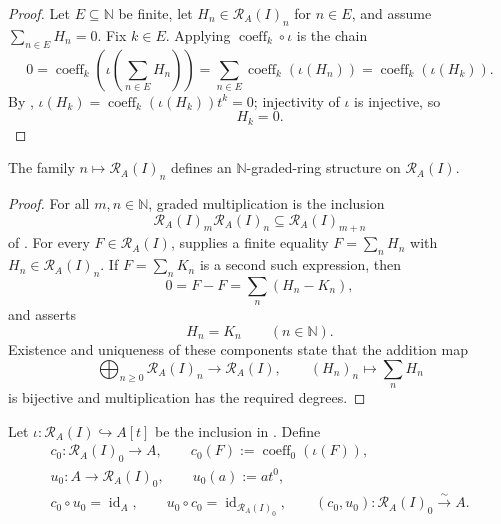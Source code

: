 \begin{proof}
  \leanok
  Let $E\subseteq\mathbb N$ be finite, let
  $H_n\in\mathcal R_A(I)_n$ for $n\in E$, and assume
  $\sum_{n\in E}H_n=0$.  Fix $k\in E$.  Applying
  $\operatorname{coeff}_k\circ\iota$ is the chain
  \[
    0
      =\operatorname{coeff}_k\!\left(\iota\!\left(
          \sum_{n\in E}H_n\right)\right)
      =\sum_{n\in E}\operatorname{coeff}_k(\iota(H_n))
      =\operatorname{coeff}_k(\iota(H_k)).
  \]
  By ,
  $\iota(H_k)=\operatorname{coeff}_k(\iota(H_k))t^k=0$; injectivity of
  $\iota$ is injective, so
  \[
    H_k=0.
  \]
\end{proof}

\begin{proposition}
  \label{prop:nagata-rees-graded}
  \leanok

  The family $n\mapsto\mathcal R_A(I)_n$ defines an
  $\mathbb N$-graded-ring structure on $\mathcal R_A(I)$.
\end{proposition}

\begin{proof}
  \leanok
  For all $m,n\in\mathbb N$, graded multiplication is the inclusion
  \[
    \mathcal R_A(I)_m\mathcal R_A(I)_n
      \subseteq\mathcal R_A(I)_{m+n}
  \]
  of .  For every
  $F\in\mathcal R_A(I)$,  supplies a
  finite equality $F=\sum_nH_n$ with
  $H_n\in\mathcal R_A(I)_n$.  If $F=\sum_nK_n$ is a second such expression,
  then
  \[
    0=F-F=\sum_n(H_n-K_n),
  \]
  and  asserts
  \[
    H_n=K_n\qquad(n\in\mathbb N).
  \]
  Existence and uniqueness of these components state that the addition map
  \[
    \bigoplus_{n\ge0}\mathcal R_A(I)_n\longrightarrow\mathcal R_A(I),
    \qquad (H_n)_n\longmapsto\sum_nH_n
  \]
  is bijective and multiplication has the required degrees.
\end{proof}

\begin{lemma}
  \label{lemma:nagata-rees-degree-zero}
  \leanok

  Let $\iota\colon\mathcal R_A(I)\hookrightarrow A[t]$ be the inclusion in
  .  Define
  \[
  \begin{gathered}
    c_0\colon\mathcal R_A(I)_0\to A,\qquad
      c_0(F):=\operatorname{coeff}_0(\iota(F)),\\
    u_0\colon A\to\mathcal R_A(I)_0,\qquad u_0(a):=at^0,\\
    c_0\circ u_0=\operatorname{id}_A,\qquad
    u_0\circ c_0=\operatorname{id}_{\mathcal R_A(I)_0},\qquad
    (c_0,u_0)\colon\mathcal R_A(I)_0\xrightarrow{\sim}A.
  \end{gathered}                                                    \tag{RZ0}
  \]
\end{lemma}

